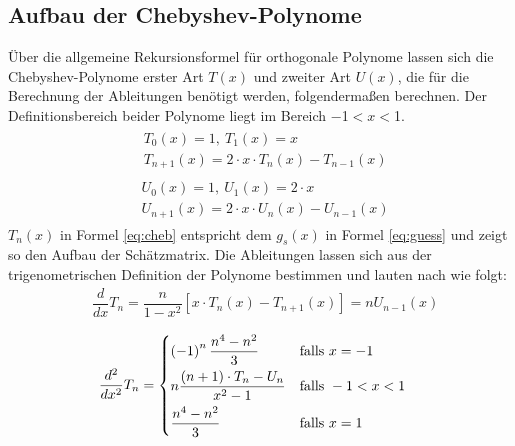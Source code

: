 \subsection{Aufbau der Chebyshev-Polynome}
Über die allgemeine Rekursionsformel für orthogonale Polynome \citep{Abramowitz-1972} lassen sich die Chebyshev-Polynome erster Art $T(x)$ und zweiter Art $U(x)$, die für die Berechnung der Ableitungen benötigt werden, folgendermaßen berechnen. Der Definitionsbereich beider Polynome liegt im Bereich \num{-1}$<x<$\num{1}.
\begin{align}
\begin{split} \label{eq:cheb}
& T_0(x) = 1, \: T_1(x) = x \\
& T_{n+1}(x) = 2 \cdot x \cdot T_n(x) - T_{n-1}(x)
\end{split}
\end{align} 
\begin{align}
\begin{split}
& U_0(x) = 1, \: U_1(x) = 2 \cdot x \\ 
& U_{n+1}(x) = 2 \cdot x \cdot U_n(x) - U_{n-1}(x)
\end{split}
\end{align}
$T_n(x)$ in Formel \ref{eq:cheb} entspricht dem $g_s(x)$ in Formel \ref{eq:guess} und zeigt so den Aufbau der Schätzmatrix. Die Ableitungen lassen sich aus der trigenometrischen Definition der Polynome bestimmen und lauten nach \citet{spanier-1987} wie folgt:
\begin{align}
& \dfrac{d}{dx} T_n = \dfrac{n}{1-x^2} \left[ x \cdot T_n \left( x \right) - T_{n+1} \left( x \right) \right] = nU_{n-1} \left( x \right)
\end{align} 

\begin{align}
& \dfrac{d^2}{dx^2} T_n = 
  \begin{dcases} 
   \left(-1\right)^{n} \dfrac{n^4 - n^2}{3}  & \text{falls } x = -1 \\
   n \dfrac{(n+1) \cdot T_n - U_n}{x^2 - 1} & \text{falls } -1 < x < 1 \\
   \dfrac{n^4 - n^2}{3}                      & \text{falls } x = 1
  \end{dcases}
\end{align} 

